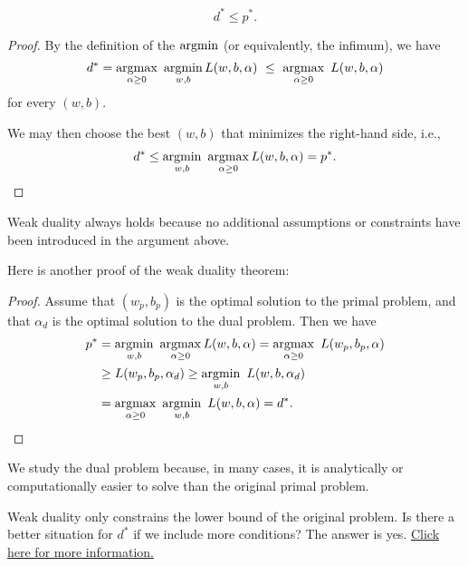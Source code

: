\documentclass[../main]{subfiles}
\begin{document}
\begin{theorem}
    \begin{equation}
        d^* \le p^*.
    \end{equation}
\end{theorem}

\begin{proof}
    By the definition of the $\mathop{\mathrm{argmin}}$ (or equivalently, the infimum), we have
    \begin{align}
        d^* = \mathop{\mathrm{argmax}}_{\alpha \ge 0}\ \mathop{\mathrm{argmin}}_{w,b} L(w,b,\alpha)
        \ \le\ \mathop{\mathrm{argmax}}_{\alpha \ge 0}\ L(w,b,\alpha)
    \end{align}
    for every $(w,b)$.  

    We may then choose the best $(w,b)$ that minimizes the right-hand side, i.e.,
    \begin{equation}
        d^* \le \mathop{\mathrm{argmin}}_{w,b}\ \mathop{\mathrm{argmax}}_{\alpha \ge 0} L(w,b,\alpha) = p^*.
    \end{equation}
\end{proof}

Weak duality always holds because no additional assumptions or constraints have been introduced in the argument above.

Here is another proof of the weak duality theorem:
\begin{proof}
    Assume that $(w_p, b_p)$ is the optimal solution to the primal problem, and that $\alpha_d$ is the optimal solution to the dual problem. Then we have
    \begin{align*}
        p^*
        &= \mathop{\mathrm{argmin}}_{w,b}\ \mathop{\mathrm{argmax}}_{\alpha \ge 0} L(w,b,\alpha)
         = \mathop{\mathrm{argmax}}_{\alpha \ge 0}\ L(w_p, b_p, \alpha) \\
        &\ge L(w_p, b_p, \alpha_d)
         \ge \mathop{\mathrm{argmin}}_{w,b}\ L(w,b,\alpha_d) \\
        &= \mathop{\mathrm{argmax}}_{\alpha \ge 0}\ \mathop{\mathrm{argmin}}_{w,b}\ L(w,b,\alpha)
         = d^*.
    \end{align*}
\end{proof}

\begin{remark}
    We study the dual problem because, in many cases, it is analytically or computationally easier to solve than the original primal problem.
\end{remark}

Weak duality only constrains the lower bound of the original problem.  
Is there a better situation for $d^*$ if we include more conditions?  
The answer is yes.  
\href{https://stanford.edu/~boyd/cvxbook/bv_cvxbook.pdf}{Click here for more information.}  
\end{document}
